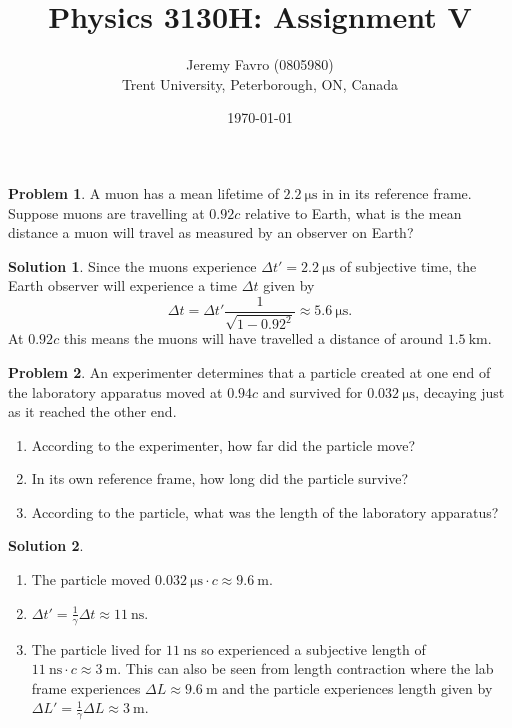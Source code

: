\documentclass[10pt]{article}
\title{Physics 3130H: Assignment V}
\author{Jeremy Favro (0805980) \\ Trent University, Peterborough, ON, Canada}
\date{\today}
\theoremstyle{definition}
\newtheorem{problem}{Problem}
\newtheorem{soln}{Solution}
\begin{document}
\maketitle

\begin{problem}
A muon has a mean lifetime of $\qty{2.2}{\micro\second}$ in in its reference frame. Suppose muons are
travelling at $0.92c$ relative to Earth, what is the mean distance a muon will travel as
measured by an observer on Earth?
\end{problem}
\begin{soln}
  Since the muons experience $\Delta t'=\qty{2.2}{\micro\second}$ of subjective time, the Earth observer will experience a time $\Delta t$ given by
  $$\Delta t = \Delta t'\frac{1}{\sqrt{1-0.92^2}}\approx\qty{5.6}{\micro\second}.$$
  At $0.92c$ this means the muons will have travelled a distance of around $\qty{1.5}{\kilo\meter}$.
\end{soln}

\begin{problem}
An experimenter determines that a particle created at one end of the laboratory apparatus
moved at $0.94c$ and survived for $\qty{0.032}{\micro\second}$, decaying just as it reached the other end.
\begin{enumerate}[label=(\alph*)]
  \item According to the experimenter, how far did the particle move?
  \item In its own reference frame, how long did the particle survive?
  \item According to the particle, what was the length of the laboratory apparatus?
\end{enumerate}
\end{problem}
\begin{soln}~
  \begin{enumerate}[label=(\alph*)]
    \item The particle moved $\qty{0.032}{\micro\second}\cdot c\approx \qty{9.6}{\meter}$.
    \item $\Delta t'=\frac{1}{\gamma}\Delta t\approx \qty{11}{\nano\second}$.
    \item The particle lived for $\qty{11}{\nano\second}$ so experienced a subjective length of $\qty{11}{\nano\second}\cdot c \approx \qty{3}{\meter}$.
          This can also be seen from length contraction where the lab frame experiences $\Delta L \approx \qty{9.6}{\meter}$ and the particle experiences length given by
          $\Delta L'=\frac{1}{\gamma}\Delta L\approx \qty{3}{\meter}$.
  \end{enumerate}
\end{soln}
\end{document}
